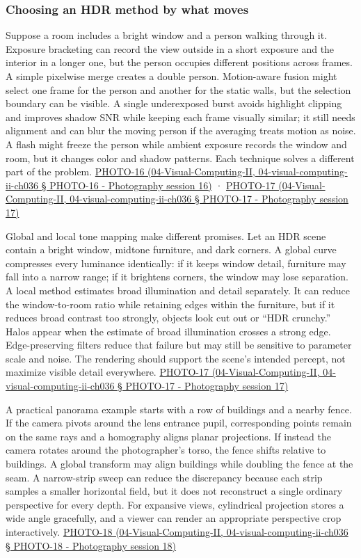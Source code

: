 \subsubsection{Choosing an HDR method by what moves}\label{choosing-an-hdr-method-by-what-moves}

Suppose a room includes a bright window and a person walking through it. Exposure bracketing can record the view outside in a short exposure and the interior in a longer one, but the person occupies different positions across frames. A simple pixelwise merge creates a double person. Motion-aware fusion might select one frame for the person and another for the static walls, but the selection boundary can be visible. A single underexposed burst avoids highlight clipping and improves shadow SNR while keeping each frame visually similar; it still needs alignment and can blur the moving person if the averaging treats motion as noise. A flash might freeze the person while ambient exposure records the window and room, but it changes color and shadow patterns. Each technique solves a different part of the problem. \href{}{PHOTO-16 (04-Visual-Computing-II, 04-visual-computing-ii-ch036 § PHOTO-16 - Photography session 16)} · \href{}{PHOTO-17 (04-Visual-Computing-II, 04-visual-computing-ii-ch036 § PHOTO-17 - Photography session 17)}

Global and local tone mapping make different promises. Let an HDR scene contain a bright window, midtone furniture, and dark corners. A global curve compresses every luminance identically: if it keeps window detail, furniture may fall into a narrow range; if it brightens corners, the window may lose separation. A local method estimates broad illumination and detail separately. It can reduce the window-to-room ratio while retaining edges within the furniture, but if it reduces broad contrast too strongly, objects look cut out or ``HDR crunchy.'' Halos appear when the estimate of broad illumination crosses a strong edge. Edge-preserving filters reduce that failure but may still be sensitive to parameter scale and noise. The rendering should support the scene's intended percept, not maximize visible detail everywhere. \href{}{PHOTO-17 (04-Visual-Computing-II, 04-visual-computing-ii-ch036 § PHOTO-17 - Photography session 17)}

A practical panorama example starts with a row of buildings and a nearby fence. If the camera pivots around the lens entrance pupil, corresponding points remain on the same rays and a homography aligns planar projections. If instead the camera rotates around the photographer's torso, the fence shifts relative to buildings. A global transform may align buildings while doubling the fence at the seam. A narrow-strip sweep can reduce the discrepancy because each strip samples a smaller horizontal field, but it does not reconstruct a single ordinary perspective for every depth. For expansive views, cylindrical projection stores a wide angle gracefully, and a viewer can render an appropriate perspective crop interactively. \href{}{PHOTO-18 (04-Visual-Computing-II, 04-visual-computing-ii-ch036 § PHOTO-18 - Photography session 18)}

